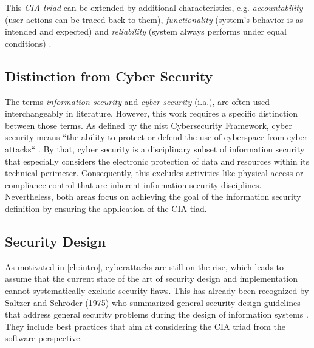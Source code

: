 	This \textit{CIA triad} can be extended by additional characteristics, e.g. \textit{accountability} (user actions can be traced back to them), \textit{functionality} (system's behavior is as intended and expected) and \textit{reliability} (system always performs under equal conditions) \cite[p. 36 sq.]{fischer-hubner_it-security_2001}.
 
\subsection{Distinction from Cyber Security} \label{subs:foundations-security-distinction}

The terms \textit{information security} and \textit{cyber security} (i.a.), are often used interchangeably in literature. However, this work requires a specific distinction between those terms. As defined by the \ac{nist} Cybersecurity Framework, cyber security means ``the ability to protect or defend the use of cyberspace from cyber attacks`` \cite{noauthor_framework_2018}. By that, cyber security is a disciplinary subset of information security that especially considers the electronic protection of data and resources within its technical perimeter. Consequently, this excludes activities like physical access or compliance control that are inherent information security disciplines. Nevertheless, both areas focus on achieving the goal of the information security definition by ensuring the application of the CIA tiad.

\subsection{Security Design} \label{subs:foundations-security-design}
As motivated in \autoref{ch:intro}, cyberattacks are still on the rise, which leads to assume that the current state of the art of security design and implementation cannot systematically exclude security flaws. This has already been recognized by Saltzer and Schröder (1975) who summarized general security design guidelines that address general security problems during the design of information systems \cite{saltzer_protection_1975}. They include best practices that aim at considering the CIA triad from the software perspective.%

